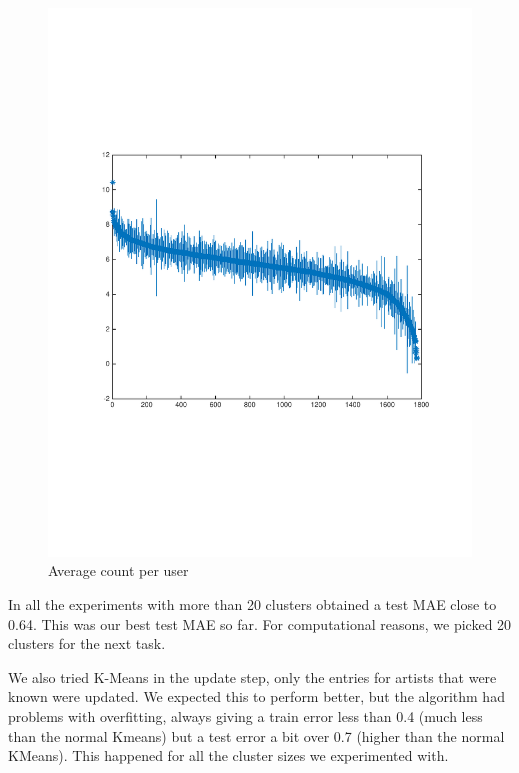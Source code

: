 \begin{figure}[h]
\begin{minipage}[b]{0.45\textwidth}
    \includegraphics[clip, trim=2cm 6.8cm 1.5cm 7cm, width=\textwidth]{figures/MeanStdCountPerUser.pdf}
    \caption{Average count per user}
    \label{fig:MeanStdCountPerUser}
    \vspace{2 mm}
  \end{minipage}
\end{figure}

In all the experiments with more than 20 clusters obtained a test MAE close to 0.64. This was our best test MAE so far. For computational reasons, we picked 20 clusters for the next task.

We also tried K-Means in the update step, only the entries for artists that were known were updated. We expected this to perform better, but the algorithm had problems with overfitting, always giving a train error less than 0.4 (much less than the normal Kmeans) but a test error a bit over 0.7 (higher than the normal KMeans). This happened for all the cluster sizes we experimented with.

